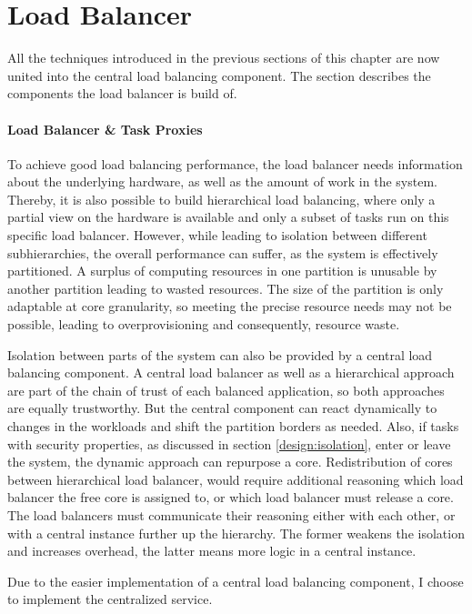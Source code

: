 \section{Load Balancer}
\label{design:balancer}

All the techniques introduced in the previous sections of this chapter
are now united into the central load balancing component.
The section describes the components the load balancer is build of.


\paragraph{Load Balancer \& Task Proxies}
To achieve good load balancing performance, the load balancer needs information
about the underlying hardware, as well as the amount of work in the system.
Thereby, it is also possible to build hierarchical load balancing, where
only a partial view on the hardware is available and only a subset of tasks run
on this specific load balancer.
However, while leading to isolation between different subhierarchies,
the overall performance can suffer, as the system is effectively partitioned.
A surplus of computing resources in one partition is unusable by another
partition leading to wasted resources.
The size of the partition is only adaptable at core granularity, so meeting the
precise resource needs may not be possible, leading to overprovisioning and
consequently, resource waste.

Isolation between parts of the system can also be provided by a central load
balancing component.
A central load balancer as well as a hierarchical approach are part of the chain
of trust of each balanced application, so both approaches are equally
trustworthy.
But the central component can react dynamically to changes in the workloads and
shift the partition borders as needed.
Also, if tasks with security properties, as discussed in section
\ref{design:isolation}, enter or leave the system, the dynamic approach can
repurpose a core.
Redistribution of cores between hierarchical load balancer, would require
additional reasoning which load balancer the free core is assigned to, or which
load balancer must release a core.
The load balancers must communicate their reasoning either with each other, or
with a central instance further up the hierarchy.
The former weakens the isolation and increases overhead, the latter means more
logic in a central instance.

Due to the easier implementation of a central load balancing component,
I choose to implement the centralized service.
\\

